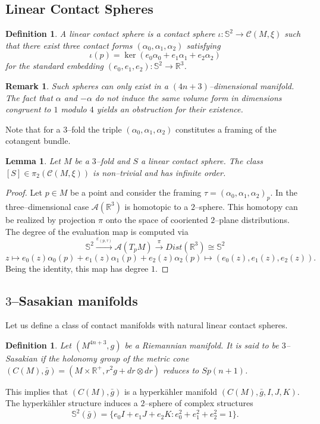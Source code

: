 \documentclass[10pt]{amsart}
\newtheorem{definition}[proposition]{Definition}
\newtheorem{lemma}[proposition]{Lemma}
\newtheorem{remark}[proposition]{Remark}
\begin{document}
\subsection{Linear Contact Spheres}
\begin{definition}
A linear contact sphere is a contact sphere $\iota:{\mathbb{S}}^2\longrightarrow{\mathcal{C}}(M,\xi)$ such that there exist three contact forms $(\alpha_0,\alpha_1,\alpha_2)$ satisfying
$$\iota(p)=\ker(e_0\alpha_0+e_1\alpha_1+e_2\alpha_2)$$
for the standard embedding $(e_0,e_1,e_2):{\mathbb{S}}^2\longrightarrow{\mathbb{R}}^3$.
\end{definition}
\begin{remark}
Such spheres can only exist in a $(4n+3)$--dimensional manifold. The fact that $\alpha$ and $-\alpha$ do not induce the same volume form in dimensions congruent to $1$ modulo $4$ yields an obstruction for their existence.
\end{remark}
\noindent Note that for a $3$--fold the triple $(\alpha_0,\alpha_1,\alpha_2)$ constitutes a framing of the cotangent bundle.
\begin{lemma}
Let $M$ be a $3$--fold and $S$ a linear contact sphere. The class $[S]\in\pi_2({\mathcal{C}}(M,\xi))$ is non--trivial and has infinite order.
\end{lemma}
\begin{proof}
Let $p\in M$ be a point and consider the framing $\tau=(\alpha_0,\alpha_1,\alpha_2)_p$. In the three--dimensional case ${\mathcal{A}}({\mathbb{R}}^3)$ is homotopic to a $2$--sphere. This homotopy can be realized by projection $\pi$ onto the space of cooriented $2$--plane distributions. The degree of the evaluation map is computed via
$${\mathbb{S}}^2\stackrel{\varepsilon_{(p,\tau)}}{\longrightarrow}{\mathcal{A}}(T_pM)\stackrel{\pi}{\longrightarrow}Dist({\mathbb{R}}^3)\cong{\mathbb{S}}^2$$
$$z\longmapsto e_0(z)\alpha_0(p)+e_1(z)\alpha_1(p)+e_2(z)\alpha_2(p)\longmapsto (e_0(z),e_1(z),e_2(z)).$$
Being the identity, this map has degree $1$.
\end{proof}
\subsection{$3$--Sasakian manifolds}
Let us define a class of contact manifolds with natural linear contact spheres.

\begin{definition}
Let $(M^{4n+3},g)$ be a Riemannian manifold. It is said to be $3$--Sasakian if the holonomy group of the metric cone $(C(M),\bar{g})=(M\times{\mathbb{R}}^+, r^2g+dr\otimes dr)$ reduces to $Sp(n+1)$.
\end{definition}
\noindent This implies that $(C(M),\bar{g})$ is a hyperk\"ahler manifold $(C(M),\bar{g},I,J,K)$. The hyperk\"ahler structure induces a $2$--sphere of complex structures
$${\mathbb{S}}^2(\bar{g})=\{e_0I+e_1J+e_2K: e_0^2+e_1^2+e_2^2=1\}.$$
\end{document}
